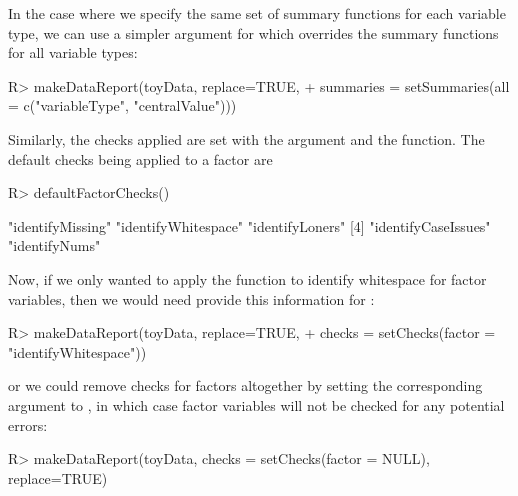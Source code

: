 \documentclass[article,shortnames]{jss}
\begin{document}
In the case where we specify the same set of summary
functions for each variable type, we can use a simpler argument for  which overrides the summary functions for all
variable types:


\begin{Schunk}
\begin{Sinput}
R> makeDataReport(toyData, replace=TRUE,                               
+    summaries = setSummaries(all = c("variableType", "centralValue")))
\end{Sinput}
\end{Schunk}

Similarly, the checks applied are set with the  argument and the  function. The default checks being applied to a factor are

\begin{Schunk}
\begin{Sinput}
R> defaultFactorChecks()
\end{Sinput}
\begin{Soutput}
[1] "identifyMissing"    "identifyWhitespace" "identifyLoners"    
[4] "identifyCaseIssues" "identifyNums"      
\end{Soutput}
\end{Schunk}

Now, if we only wanted to apply the function to identify whitespace
for factor variables, then we would need provide this information for :

\begin{Schunk}
\begin{Sinput}
R> makeDataReport(toyData, replace=TRUE,
+    checks = setChecks(factor = "identifyWhitespace"))
\end{Sinput}
\end{Schunk}

or we could remove checks for factors altogether by setting the
corresponding argument to , in which case factor variables will
not be checked for any potential errors:

\begin{Schunk}
\begin{Sinput}
R> makeDataReport(toyData, checks = setChecks(factor = NULL), replace=TRUE)
\end{Sinput}
\end{Schunk}
\end{document}
